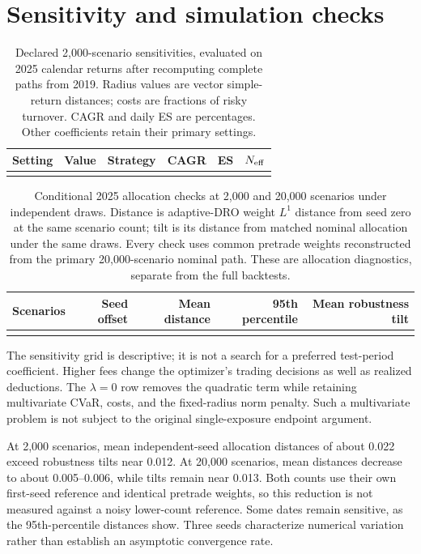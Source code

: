 \section{Sensitivity and simulation checks}
\label{app:sensitivity}
\begin{table}[t]
\centering\small\setlength{\tabcolsep}{5pt}
\caption{Declared 2,000-scenario sensitivities, evaluated on 2025 calendar returns after recomputing complete paths from 2019. Radius values are vector simple-return distances; costs are fractions of risky turnover. CAGR and daily ES are percentages. Other coefficients retain their primary settings.}
\label{tab:sensitivity}
\begin{tabular}{lllr rr}\toprule
Setting&Value&Strategy&CAGR&ES&$N_{\rm eff}$\\\midrule
\\\bottomrule
\end{tabular}
\end{table}
\begin{table}[t]
\centering\small\setlength{\tabcolsep}{5pt}
\caption{Conditional 2025 allocation checks at 2,000 and 20,000 scenarios under independent draws. Distance is adaptive-DRO weight $L^1$ distance from seed zero at the same scenario count; tilt is its distance from matched nominal allocation under the same draws. Every check uses common pretrade weights reconstructed from the primary 20,000-scenario nominal path. These are allocation diagnostics, separate from the full backtests.}
\label{tab:monte_carlo}
\begin{tabular}{rrrrr}\toprule
Scenarios&Seed offset&Mean distance&95th percentile&Mean robustness tilt\\\midrule
\\\bottomrule
\end{tabular}
\end{table}
The sensitivity grid is descriptive; it is not a search for a preferred test-period coefficient. Higher fees change the optimizer's trading decisions as well as realized deductions. The $\lambda=0$ row removes the quadratic term while retaining multivariate CVaR, costs, and the fixed-radius norm penalty. Such a multivariate problem is not subject to the original single-exposure endpoint argument.

At 2,000 scenarios, mean independent-seed allocation distances of about 0.022 exceed robustness tilts near 0.012. At 20,000 scenarios, mean distances decrease to about 0.005--0.006, while tilts remain near 0.013. Both counts use their own first-seed reference and identical pretrade weights, so this reduction is not measured against a noisy lower-count reference. Some dates remain sensitive, as the 95th-percentile distances show. Three seeds characterize numerical variation rather than establish an asymptotic convergence rate.


